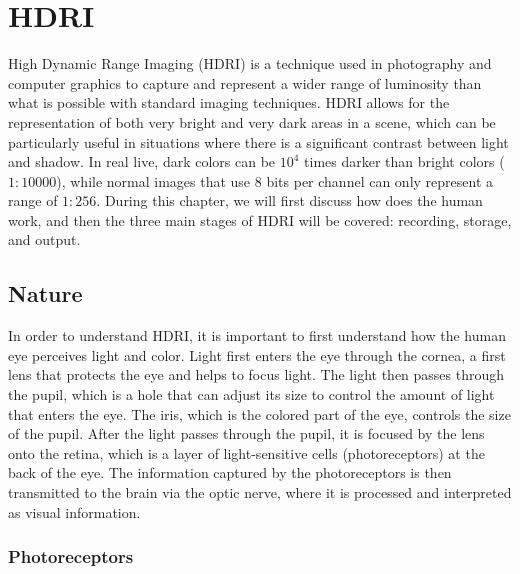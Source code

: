 \chapter{HDRI}

High Dynamic Range Imaging (HDRI) is a technique used in photography and computer graphics to capture and represent a wider range of luminosity than what is possible with standard imaging techniques. HDRI allows for the representation of both very bright and very dark areas in a scene, which can be particularly useful in situations where there is a significant contrast between light and shadow. In real live, dark colors can be $10^4$ times darker than bright colors ($1:10000$), while normal images that use $8$ bits per channel can only represent a range of $1:256$. During this chapter, we will first discuss how does the human work, and then the three main stages of HDRI will be covered: recording, storage, and output.

\section{Nature}

In order to understand HDRI, it is important to first understand how the human eye perceives light and color. Light first enters the eye through the cornea, a first lens that protects the eye and helps to focus light. The light then passes through the pupil, which is a hole that can adjust its size to control the amount of light that enters the eye. The iris, which is the colored part of the eye, controls the size of the pupil. After the light passes through the pupil, it is focused by the lens onto the retina, which is a layer of light-sensitive cells (photoreceptors) at the back of the eye. The information captured by the photoreceptors is then transmitted to the brain via the optic nerve, where it is processed and interpreted as visual information.

\subsection{Photoreceptors}

